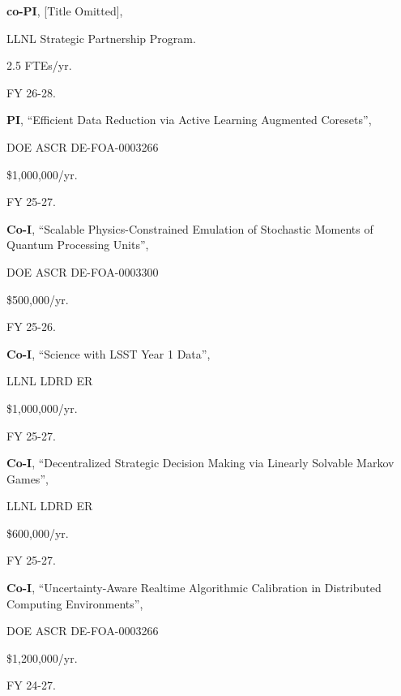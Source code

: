\begin{innerlist}

  \item[] \textbf{co-PI},
  [Title Omitted],
  \begin{innerlist}
    \item[-] LLNL Strategic Partnership Program.
    \item[-] 2.5 FTEs/yr.
    \item[-] FY 26-28.
  \end{innerlist}

  \item[] \textbf{PI},
  ``Efficient Data Reduction via Active Learning Augmented Coresets'',
  \begin{innerlist}
    \item[-] DOE ASCR DE-FOA-0003266
    \item[-] \$1,000,000/yr.
    \item[-] FY 25-27.
  \end{innerlist}

  \item[] \textbf{Co-I},
  ``Scalable Physics-Constrained Emulation of Stochastic Moments of Quantum Processing Units'',
  \begin{innerlist}
    \item[-] DOE ASCR DE-FOA-0003300
    \item[-] \$500,000/yr.
    \item[-] FY 25-26.
  \end{innerlist}

  \item[] \textbf{Co-I},
  ``Science with LSST Year 1 Data'',
  \begin{innerlist}
    \item[-] LLNL LDRD ER
    \item[-] \$1,000,000/yr.
    \item[-] FY 25-27.
  \end{innerlist}

  \item[] \textbf{Co-I},
  ``Decentralized Strategic Decision Making via Linearly Solvable Markov Games'',
  \begin{innerlist}
    \item[-] LLNL LDRD ER
    \item[-] \$600,000/yr.
    \item[-] FY 25-27.
  \end{innerlist}

  \item[] \textbf{Co-I},
  ``Uncertainty-Aware Realtime Algorithmic Calibration in Distributed Computing Environments'',
  \begin{innerlist}
    \item[-] DOE ASCR DE-FOA-0003266
    \item[-] \$1,200,000/yr.
    \item[-] FY 24-27.
  \end{innerlist}


\end{innerlist}
